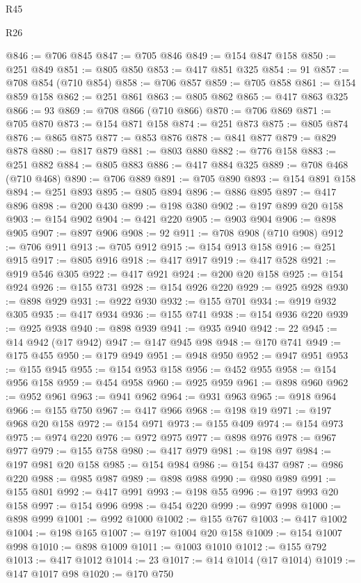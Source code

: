 \begin{lexlean}{R45}
\begin{lexlean}{R26}
\begin{coremodule}
{{{{{{{{{{{{{{{{{{{{{{{{{{{{{{{{{{{{{{{{{{{{{{{{{{{{{{{{{{{{{{{{{{{{{{{{@846 := @706 @845
@847 := @705 @846
@849 := @154 @847 @158
@850 := @251 @849
@851 := @805 @850
@853 := @417 @851 @325
@854 := 91
@857 := @708 @854 (@710 @854)
@858 := @706 @857
@859 := @705 @858
@861 := @154 @859 @158
@862 := @251 @861
@863 := @805 @862
@865 := @417 @863 @325
@866 := 93
@869 := @708 @866 (@710 @866)
@870 := @706 @869
@871 := @705 @870
@873 := @154 @871 @158
@874 := @251 @873
@875 := @805 @874
@876 := @865 @875
@877 := @853 @876
@878 := @841 @877
@879 := @829 @878
@880 := @817 @879
@881 := @803 @880
@882 := @776 @158
@883 := @251 @882
@884 := @805 @883
@886 := @417 @884 @325
@889 := @708 @468 (@710 @468)
@890 := @706 @889
@891 := @705 @890
@893 := @154 @891 @158
@894 := @251 @893
@895 := @805 @894
@896 := @886 @895
@897 := @417 @896
@898 := @200 @430
@899 := @198 @380
@902 := @197 @899 @20 @158
@903 := @154 @902
@904 := @421 @220
@905 := @903 @904
@906 := @898 @905
@907 := @897 @906
@908 := 92
@911 := @708 @908 (@710 @908)
@912 := @706 @911
@913 := @705 @912
@915 := @154 @913 @158
@916 := @251 @915
@917 := @805 @916
@918 := @417 @917
@919 := @417 @528
@921 := @919 @546 @305
@922 := @417 @921
@924 := @200 @20 @158
@925 := @154 @924
@926 := @155 @731
@928 := @154 @926 @220
@929 := @925 @928
@930 := @898 @929
@931 := @922 @930
@932 := @155 @701
@934 := @919 @932 @305
@935 := @417 @934
@936 := @155 @741
@938 := @154 @936 @220
@939 := @925 @938
@940 := @898 @939
@941 := @935 @940
@942 := 22
@945 := @14 @942 (@17 @942)
@947 := @147 @945 @98
@948 := @170 @741
@949 := @175 @455
@950 := @179 @949
@951 := @948 @950
@952 := @947 @951
@953 := @155 @945
@955 := @154 @953 @158
@956 := @452 @955
@958 := @154 @956 @158
@959 := @454 @958
@960 := @925 @959
@961 := @898 @960
@962 := @952 @961
@963 := @941 @962
@964 := @931 @963
@965 := @918 @964
@966 := @155 @750
@967 := @417 @966
@968 := @198 @19
@971 := @197 @968 @20 @158
@972 := @154 @971
@973 := @155 @409
@974 := @154 @973
@975 := @974 @220
@976 := @972 @975
@977 := @898 @976
@978 := @967 @977
@979 := @155 @758
@980 := @417 @979
@981 := @198 @97
@984 := @197 @981 @20 @158
@985 := @154 @984
@986 := @154 @437
@987 := @986 @220
@988 := @985 @987
@989 := @898 @988
@990 := @980 @989
@991 := @155 @801
@992 := @417 @991
@993 := @198 @55
@996 := @197 @993 @20 @158
@997 := @154 @996
@998 := @454 @220
@999 := @997 @998
@1000 := @898 @999
@1001 := @992 @1000
@1002 := @155 @767
@1003 := @417 @1002
@1004 := @198 @165
@1007 := @197 @1004 @20 @158
@1009 := @154 @1007 @998
@1010 := @898 @1009
@1011 := @1003 @1010
@1012 := @155 @792
@1013 := @417 @1012
@1014 := 23
@1017 := @14 @1014 (@17 @1014)
@1019 := @147 @1017 @98
@1020 := @170 @750
}}}}}}}}}}}}}}}}}}}}}}}}}}}}}}}}}}}}}}}}}}}}}}}}}}}}}}}}}}}}}}}}}}}}}}}}
\end{coremodule}
\end{lexlean}
\end{lexlean}
